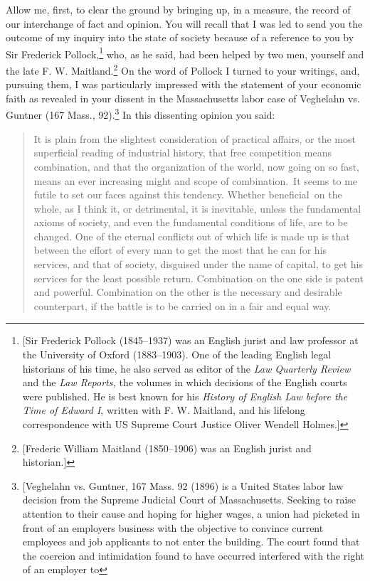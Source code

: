 \documentclass[twoside,symmetric,nobib,justified]{tufte-book}
\begin{document}
Allow me, first, to clear the ground by bringing up, in a measure, the
record of our interchange of fact and opinion. You will recall that I
was led to send you the outcome of my inquiry into the state of society
because of a reference to you by Sir Frederick Pollock,\footnote{{[}Sir
  Frederick Pollock\textbf{ }(1845--1937) was an
  English jurist and law professor at the University of Oxford
  (1883--1903). One of the leading English legal historians of his time,
  he also served as editor of the \emph{Law Quarterly Review} and
  the \emph{Law Reports,} the volumes in which decisions of the English
  courts were published. He is best known for his \emph{History of
  English Law before the Time of Edward I}, written with F. W. Maitland,
  and his lifelong correspondence with US Supreme Court Justice Oliver
  Wendell Holmes.{]}} who, as he said, had been helped by two
men, yourself and the late F. W. Maitland.\footnote{{[}Frederic William
  Maitland (1850--1906) was an English jurist and historian.{]}} On the
word of Pollock I turned to your writings, and, pursuing them, I was
particularly impressed with the statement of your economic faith as
revealed in your dissent in the Massachusetts labor case
of Veghelahn vs. Guntner (167 Mass., 92).\footnote{{[}Veghelahn vs. Guntner,
  167 Mass. 92 (1896) is a United States labor law decision from the
  Supreme Judicial Court of Massachusetts. Seeking to raise attention
  to their cause and hoping for higher wages, a union had picketed in
  front of an employer\textquotesingle s business with the objective
  to convince current employees and job applicants to not enter
  the building. The court found that the coercion and
  intimidation found to have occurred interfered with the right of an
  employer to} In this dissenting opinion
you said:

\begin{quote}
It is plain from the slightest consideration of practical affairs, or
the most superficial reading of industrial history, that free
competition means combination, and that the organization of the world,
now going on so fast, means an ever increasing might and scope of
combination.~It seems to me futile to set our faces against this
tendency. Whether beneficial~on the whole, as I think it, or
detrimental, it is inevitable, unless the fundamental axioms of society,
and even the fundamental conditions of life, are to be changed. One of
the eternal conflicts out of which life is made up is that between the
effort of every man to get the most that he can for his services, and
that of society, disguised under the name of capital, to get his
services for the least possible return. Combination on the one side is
patent and powerful. Combination on the other is the necessary and
desirable counterpart, if the battle is to be carried on in a fair and
equal way.
\end{quote}
\end{document}
